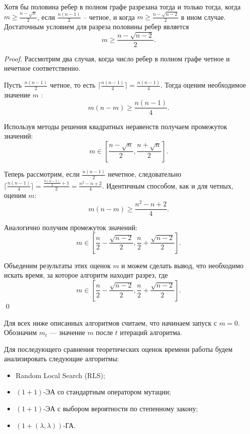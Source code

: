 \documentclass[times]{itmo-student-thesis}
\newcommand{\alglambdaf}{${(1 + (\lambda , \lambda))}$-ГА\xspace}
\newcommand{\oea}{\mbox{$(1 + 1)$-ЭА}\xspace}
\begin{document}
\begin{lemma}
  Хотя бы половина ребер в полном графе разрезана тогда и только тогда, когда $m \ge \frac{n - \sqrt{n}}{2}$, если $\frac{n(n - 1)}{2}$ -- четное, и когда $m \ge \frac{n - \sqrt{n - 2}}{2}$ в ином случае. Достаточным условием для разреза половины ребер является 
  \[
    m \ge \frac{n - \sqrt{n - 2}}{2}.
  \]
\end{lemma}

\begin{proof}
  Рассмотрим два случая, когда число ребер в полном графе четное и нечетное соответственно.

  Пусть $\frac{n(n-1)}{2}$ четное, то есть $\lceil \frac{n(n-1)}{4} \rceil = \frac{n(n-1)}{4}$.
  Тогда оценим необходимое значение $m$ :
  $$
    m(n-m) \ge \frac{n(n-1)}{4}.
  $$

  Используя методы решения квадратных неравенств получаем промежуток значений:
  $$
  m \in \left[\frac{n - \sqrt{n}}{2}, \frac{n + \sqrt{n}}{2}\right].
  $$

  Теперь рассмотрим, если $\frac{n(n-1)}{2}$ нечетное, следовательно $\lceil \frac{n(n-1)}{4} \rceil = \frac{\frac{n(n-1)}{2}+1}{2} = \frac{n^2-n+2}{4}$.
  Идентичным способом, как и для четных, оценим $m$:
  $$
    m(n-m) \ge \frac{n^2-n+2}{4}.
  $$

  Аналогично получим промежуток значений:
  $$
  m \in \left[\frac{n}{2} -\frac{\sqrt{n-2}}{2},  \frac{n}{2} + \frac{\sqrt{n-2}}{2}\right].
  $$

  Объеденим результаты этих оценок $m$ и можем сделать вывод, что необходимо искать время, за которое алгоритм находит разрез, где
  $$
  m \in \left[\frac{n}{2} -\frac{\sqrt{n-2}}{2},  \frac{n}{2} + \frac{\sqrt{n-2}}{2}\right].
  $$
  \qed
\end{proof}

Для всех ниже описанных алгоритмов считаем, что начинаем запуск с $m = 0$. Обозначим $m_t$ --- значение $m$ после $t$ итераций алгоритма.

Для последующего сравнения теоретических оценок времени работы будем анализировать следующие алгоритмы:
\begin{itemize}
  \item Random Local Search (RLS);
  \item \oea со стандартным оператором мутации;
  \item \oea с выбором вероятности по степенному закону;
  \item \alglambdaf.
\end{itemize}
\end{document}

